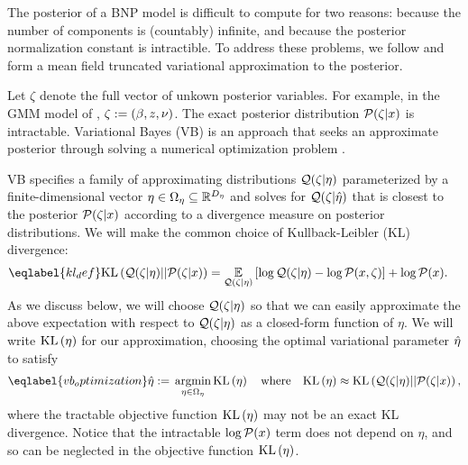 The posterior of a BNP model is difficult to compute for two reasons: because
the number of components is (countably) infinite, and because the posterior
normalization constant is intractible.  To address these problems, we follow
\citet{blei:2006:vi_for_dp} and form a mean field truncated variational
approximation to the posterior.

Let $\zeta$ denote the full vector of unkown posterior variables. For example,
in the GMM model of , $\zeta := (\beta, z, \nu)$.  The
exact posterior distribution $\mathcal{P}(\zeta \vert x)$ is intractable. Variational
Bayes (VB) is an approach that seeks an approximate posterior through solving a
numerical optimization problem \citep{jordan:1999:vi,
wainwright:2008:graphical_models, blei:2017:vi_review}.

VB specifies a family of approximating distributions $\mathcal{Q}(\zeta \vert \eta)$
parameterized by a finite-dimensional vector $\eta \in \Omega_{\eta} \subseteq
\mathbb{R}^{{D_{\eta}}}$ and solves for $\mathcal{Q}(\zeta\vert\hat\eta)$ that is closest to
the posterior $\mathcal{P}(\zeta \vert x)$ according to a divergence measure on
posterior distributions. We will make the common choice of Kullback-Leibler (KL)
divergence:
%
\begin{align}\eqlabel{kl_def}
%
\KL{\q(\zeta \vert \eta) || \p(\zeta \vert \x)}
={}&    \expect{\q(\zeta \vert \eta)}{
        \log \q(\zeta \vert \eta) - \logp(\x, \zeta)} + \logp(\x).
%
\end{align}
%
As we discuss below, we will choose $\mathcal{Q}(\zeta \vert \eta)$ so that we can easily
approximate the above expectation with respect to $\mathcal{Q}(\zeta \vert \eta)$ as a
closed-form function of $\eta$.  We will write $\mathrm{KL}\left(\eta\right)$ for our
approximation, choosing the optimal variational parameter $\hat\eta$ to satisfy
%
\begin{align}\eqlabel{vb_optimization}
%
\etaopt :={} \argmin_{\eta \in \etadom} \KL{\eta} \mathwhere
\KL{\eta} \approx{} \KL{\q(\zeta \vert \eta) || \p(\zeta \vert \x)},
%
\end{align}
%
where the tractable objective function $\mathrm{KL}\left(\eta\right)$ may not be an exact KL
divergence. Notice that the intractable $\log \mathcal{P}(x)$ term does not depend on
$\eta$, and so can be neglected in the objective function $\mathrm{KL}\left(\eta\right)$.

